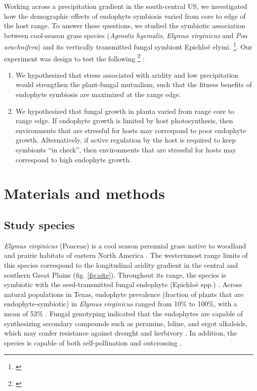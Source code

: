 \documentclass[11pt]{article}
\newcommand{\jacob}[2]{{\color{blue}{#1}}\footnote{\textit{\color{blue}{#2}}}}
\begin{document}
Working across a precipitation gradient in the south-central US, we investigated  how the demographic effects of endophyte symbiosis varied from core to edge of the host range.
To answer these questions, we studied the symbiotic association between  cool-season grass species (\emph{Agrostis hyemalis}, \emph{Elymus virginicus} and \emph{Poa arachnifera}) and its vertically transmitted fungal symbiont Epichloë elymi. \jacob{[Describe ecology and natural history of grass-endophyte interactions]}{I am not sure If we need this}.
Our experiment was design to test the following \jacob{hypotheses}{ I need to update these hypotheses by adding the herbivory effect} :
\begin{enumerate}
\item We hypothesized that stress associated with aridity and low precipitation would strengthen the plant-fungal mutualism, such that the fitness benefits of endophyte symbiosis are maximized at the range edge. 
\item We hypothesized that fungal growth in planta varied from range core to range edge. If endophyte growth is limited by host photosynthesis, then environments that are stressful for hosts may correspond to poor endophyte growth. Alternatively, if active regulation by the host is required to keep symbionts “in check”, then environments that are stressful for hosts may correspond to high endophyte growth.
\end{enumerate}

\section*{Materials and methods}
\subsection*{Study species}
\emph {Elymus virginicus} (Poaceae) is a cool season perennial grass native to woodland and prairie habitats of eastern North America \citep{shaw2011guide}. 
The westernmost range limits of this species correspond to the longitudinal aridity gradient in the central and southern Great Plains (fig. \ref{fig:site}). 
Throughout its range, the species is  symbiotic with the seed-transmitted fungal endophyte (Epichloë spp.) \citep{rudgers2009benefits}. 
Across natural populations in Texas, endophyte prevalence (fraction of plants that are endophyte-symbiotic) in \emph {Elymus virginicus}  ranged from 10\% to 100\%, with a mean of 53\% \citep{sneck2017variation}. 
Fungal genotyping indicated that the endophytes are capable of synthesizing secondary compounds such as peramine, loline, and ergot alkaloids, which may confer resistance against drought and herbivory \citep{beaudry1951seed}.
In addition, the species is capable of both self-pollination and outcrossing \citep{church1958artificial}. 
\end{document}
